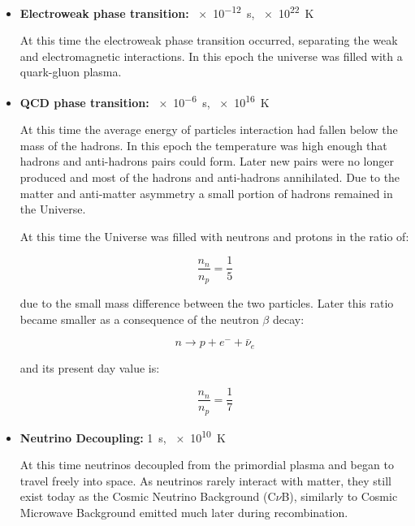 \begin{itemize}
        \item \textbf{Electroweak phase transition:} \SI{e-12}{\second},
        \SI{e22}{\kelvin}

        At this time the electroweak phase transition occurred, separating
        the weak and electromagnetic interactions. In this epoch the
        universe was filled with a quark-gluon plasma.
        \item \textbf{QCD phase transition:} \SI{e-6}{\second},
        \SI{e16}{\kelvin}

        At this time the average energy of particles interaction had fallen
        below the mass of the hadrons. In this epoch the temperature was
        high enough that hadrons and anti-hadrons pairs could form. Later
        new pairs were no longer produced and most of the hadrons and
        anti-hadrons annihilated. Due to the matter and anti-matter
        asymmetry a small portion of hadrons remained in the Universe.

        At this time the Universe was filled with neutrons and protons in
        the ratio of:

        \begin{equation}
                \frac{n_n}{n_p} = \frac{1}{5}
        \end{equation}

        due to the small mass difference between the two particles. Later
        this ratio became smaller as a consequence of the neutron $\beta$
        decay:

        \begin{equation}
                n \rightarrow p + e^- + \bar\nu_e
        \end{equation}

        and its present day value is:

        \begin{equation}
                \frac{n_n}{n_p} = \frac{1}{7}
        \end{equation}

        \item \textbf{Neutrino Decoupling:} \SI{1}{\second},
        \SI{e10}{\kelvin}

        At this time neutrinos decoupled from the primordial plasma and
        began to travel freely into space. As neutrinos rarely interact
        with matter, they still exist today as the Cosmic
        Neutrino Background (C$\nu$B), similarly to Cosmic
        Microwave Background emitted much later during recombination.


\end{itemize}
